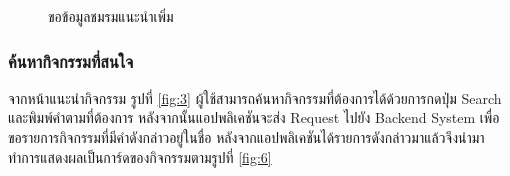 \documentclass[14pt,oneside,openright,a4paper]{cpe-thai-project}
\begin{document}
\begin{figure}[H]\centering
  \setlength{\fboxrule}{0.5mm}
  \setlength{\fboxsep}{0.5cm}
  \caption{ขอข้อมูลชมรมแนะนำเพิ่ม}\label{fig:12}
 \end{figure}

\subsubsection{ค้นหากิจกรรมที่สนใจ}
จากหน้าแนะนำกิจกรรม รูปที่ \ref{fig:3} ผู้ใช้สามารถค้นหากิจกรรมที่ต้องการได้ด้วยการกดปุ่ม Search และพิมพ์คำตามที่ต้องการ หลังจากนั้นแอปพลิเคชันจะส่ง Request ไปยัง Backend System เพื่อขอรายการกิจกรรมที่มีคำดังกล่าวอยู่ในชื่อ 
หลังจากแอปพลิเคชันได้รายการดังกล่าวมาแล้วจึงนำมาทำการแสดงผลเป็นการ์ดของกิจกรรมตามรูปที่ \ref{fig:6} 
\end{document}
